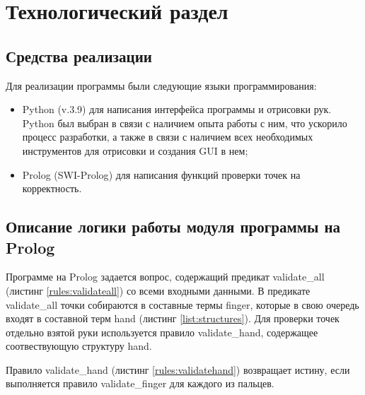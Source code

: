 \chapter{Технологический раздел}


\section{Средства реализации}
\hspace{0.6cm} Для реализации программы были следующие языки программирования:
\begin{itemize}
	\item Python (v.3.9\cite{web:python}) для написания интерфейса программы и отрисовки рук. Python был выбран в связи с наличием опыта работы с ним, что ускорило процесс разработки, а также в связи с наличием всех необходимых инструментов для отрисовки и создания GUI в нем;
	\item Prolog (SWI-Prolog\cite{web:prolog}) для написания функций проверки точек на корректность.
\end{itemize}

\section{Описание логики работы модуля программы на Prolog}

\hspace{0.6cm} Программе на Prolog задается вопрос, содержащий предикат validate\_all (листинг \ref{rules:validateall}) со всеми входными данными. В предикате validate\_all точки собираются в составные термы finger, которые в свою очередь входят в составной терм hand (листинг \ref{list:structures}). Для проверки точек отдельно взятой руки используется правило validate\_hand, содержащее соотвествующую структуру hand.



\hspace{0.6cm} Правило validate\_hand (листинг \ref{rules:validatehand}) возвращает истину, если выполняется правило validate\_finger для каждого из пальцев.

